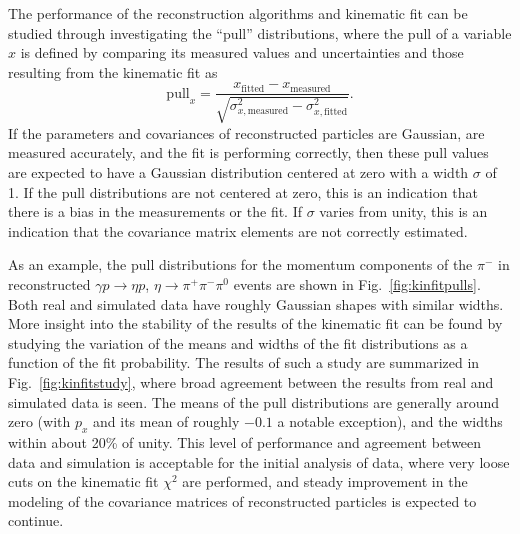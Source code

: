 The performance of the reconstruction algorithms and kinematic fit can be studied through investigating the ``pull'' distributions, where the pull of a variable $x$ is defined by comparing its measured values and uncertainties and those resulting from the kinematic fit as
\begin{equation}
    \text{pull}_x = \frac{x_\text{fitted} - x_\text{measured}}{\sqrt{\sigma_{x,\text{measured}}^2 - \sigma_{x,\text{fitted}}^2}}.
\end{equation}
If the parameters and covariances of reconstructed particles are Gaussian, are measured accurately, and the fit is performing correctly, then these pull values are expected to have a Gaussian distribution centered at zero with a width $\sigma$ of 1.  If the pull distributions are not centered at zero, this is an indication that there is a bias in the measurements or the fit.  If $\sigma$ varies from unity, this is an indication that the covariance matrix elements are not correctly estimated.  

As an example, the pull distributions for the momentum components of the $\pi^-$ in reconstructed $\gamma p \to \eta p$, $\eta \to \pi^+\pi^-\pi^0$ events are shown in Fig.~\ref{fig:kinfitpulls}.  Both real and simulated data have roughly Gaussian shapes with similar widths.  More insight into the stability of the results of the kinematic fit can be found by studying the variation of the means and widths of the fit distributions as a function of the fit probability.  The results of such a study are summarized in Fig.~\ref{fig:kinfitstudy}, where broad agreement between the results from real and simulated data is seen.  The means of the pull distributions are generally around zero (with $p_x$ and its mean of roughly $-0.1$ a notable exception), and the widths within about 20\% of unity.  This level of performance and agreement between data and simulation is acceptable for the initial analysis of data, where very loose cuts on the kinematic fit $\chi^2$ are performed, and steady improvement in the modeling of the covariance matrices of reconstructed particles is expected to continue.


